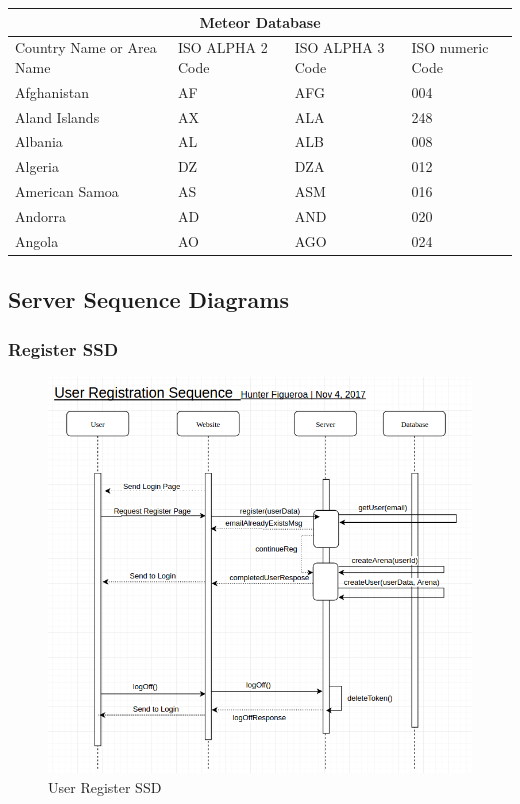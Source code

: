\documentclass[12pt,a4paper]{report}
\begin{document}
	
	\begin{tabular}{ |p{3cm}||p{3cm}|p{3cm}|p{3cm}|  }
		\hline
		\multicolumn{4}{|c|}{Meteor Database} \\
		\hline
		Country Name     or Area Name& ISO ALPHA 2 Code &ISO ALPHA 3 Code&ISO numeric Code\\
		\hline
		Afghanistan   & AF    &AFG&   004\\
		Aland Islands&   AX  & ALA   &248\\
		Albania &AL & ALB&  008\\
		Algeria    &DZ & DZA&  012\\
		American Samoa&   AS  & ASM&016\\
		Andorra& AD  & AND   &020\\
		Angola& AO  & AGO&024\\
		\hline
	\end{tabular}
	
	\subsection{Server Sequence Diagrams}
	
	\subsubsection {Register SSD}
	\begin{figure}[H]
		\centering
		\centerline{\includegraphics[scale=.7, angle=90]{ssd_register}}
		\caption{User Register SSD}
		\label{fig: User Register SSD }
	\end{figure}
	
\end{document}
